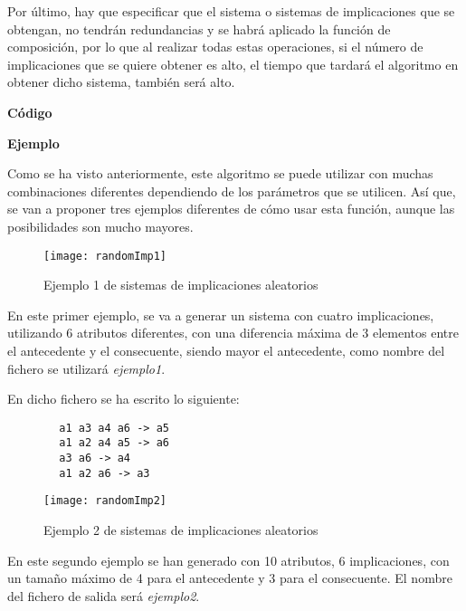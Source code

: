     Por \'ultimo, hay que especificar que el sistema o sistemas de implicaciones que se obtengan, no tendr\'an redundancias y se habr\'a aplicado 
    la funci\'on de composici\'on, por lo que al realizar todas estas operaciones, si el n\'umero de implicaciones que se quiere obtener es 
    alto, el tiempo que tardar\'a el algoritmo en obtener dicho sistema, tambi\'en ser\'a alto.
    \\

    \bigskip

    \textbf{C\'odigo}

    
    \clearpage


    \textbf{Ejemplo}

    Como se ha visto anteriormente, este algoritmo se puede utilizar con muchas combinaciones diferentes dependiendo de los par\'ametros 
    que se utilicen. As\'i que, se van a proponer tres ejemplos diferentes de c\'omo usar esta funci\'on, aunque las posibilidades 
    son mucho mayores.

    \bigskip

    \begin{figure}[H]
        \centering
        \texttt{[image: randomImp1]}
        \caption{Ejemplo 1 de sistemas de implicaciones aleatorios}
        \label{fig:randomImp1}
    \end{figure}

    En este primer ejemplo, se va a generar un sistema con cuatro implicaciones, utilizando 6 atributos diferentes, con una diferencia m\'axima 
    de 3 elementos entre el antecedente y el consecuente, siendo mayor el antecedente, como nombre del fichero se utilizar\'a \textit{ejemplo1}.
    
    En dicho fichero se ha escrito lo siguiente:

    \begin{verbatim}
        a1 a3 a4 a6 -> a5 
        a1 a2 a4 a5 -> a6 
        a3 a6 -> a4 
        a1 a2 a6 -> a3    
    \end{verbatim}


    \begin{figure}[H]
        \centering
        \texttt{[image: randomImp2]}
        \caption{Ejemplo 2 de sistemas de implicaciones aleatorios}
        \label{fig:randomImp2}
    \end{figure}

    En este segundo ejemplo se han generado con 10 atributos, 6 implicaciones, con un tama\~no m\'aximo de 4 para el antecedente y 3 para el 
    consecuente. El nombre del fichero de salida ser\'a \textit{ejemplo2}.


